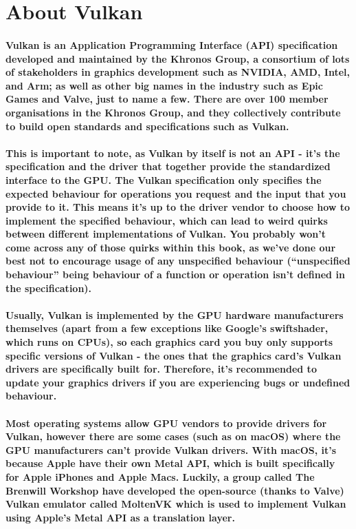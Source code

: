 \newpage
\section{\textsf{About Vulkan}}\label{about-vulkan}

\paragraph{
Vulkan is an Application Programming Interface (API) specification
developed and maintained by the Khronos Group, a consortium of lots of stakeholders in graphics development such as NVIDIA, AMD, Intel, and Arm; as well as other big names in the industry such as Epic Games and Valve, just to name a few. There are over 100 member organisations in the Khronos Group, and they collectively contribute to build open standards and specifications such as Vulkan.
}

\paragraph{
This is important to note, as Vulkan by itself is not an API - it's the specification and the driver that together provide the standardized interface to the GPU. The Vulkan specification only specifies the expected behaviour for operations you request and the input that you provide to it. This means it's up to the driver vendor to choose how to implement the specified behaviour, which can lead to weird quirks between different implementations of Vulkan. You probably won't come across any of those quirks within this book, as we've done our best not to encourage usage of any unspecified behaviour (``unspecified behaviour'' being behaviour of a function or operation isn't defined in the specification).
}

\paragraph{
Usually, Vulkan is implemented by the GPU hardware manufacturers
themselves (apart from a few exceptions like Google's swiftshader, which runs on CPUs), so each graphics card you buy only supports specific versions of Vulkan - the ones that the graphics card's Vulkan drivers are specifically built for. Therefore, it's recommended to update your graphics drivers if you are experiencing bugs or undefined behaviour.
}

\paragraph{
Most operating systems allow GPU vendors to provide drivers for Vulkan, however there are some cases (such as on macOS) where the GPU manufacturers can't provide Vulkan drivers. With macOS, it's because Apple have their own Metal API, which is built specifically for Apple iPhones and Apple Macs. Luckily, a group called The Brenwill Workshop have developed the open-source (thanks to Valve) Vulkan emulator called MoltenVK which is used to implement Vulkan using Apple's Metal API as a translation layer.
}

